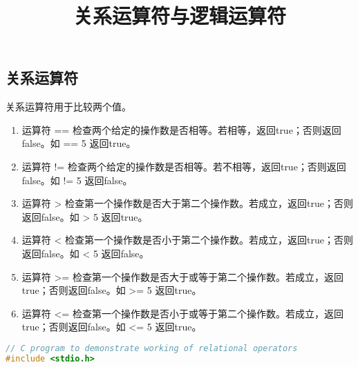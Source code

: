 \documentclass[10pt,a4paper%
tablecaptionabove]{article}
\def\tf{\ttfamily}
\begin{document}
\begin{CJK}{UTF8}{gkai}
 

\newtheorem{li}{例}
\newtheorem{jielun}{结论}
\newtheorem{dingli}{定理}
\newtheorem{mingti}{{命题}} 
\newtheorem{yinli}{{引理}} 
\newtheorem{tuilun}{{推论}}
\newtheorem{dingyi}{{定义}} 
\newtheorem{example}{{例}}
\newtheorem*{example*}{{例}}
\newtheorem*{jie}{{解}}
\newtheorem*{zhengming}{{证明}}
\newtheorem{zhu}{{注}}
\newtheorem*{zhu*}{{注}}
\newtheorem{xingzhi}{{性质}}
\newtheorem{wenti}{{问题}}
\newtheorem{rem}{{Remark}}
\newtheorem{lem}{{Lemma}}
\pagestyle{plain}


\title{关系运算符与逻辑运算符}
\maketitle

\section{关系运算符}
关系运算符用于比较两个值。
\begin{enumerate}
\item
  运算符 {\tf ==}  检查两个给定的操作数是否相等。若相等，返回{\tf true}；否则返回{\tf false}。如 {\tf 5 == 5} 返回{\tf true}。
\item
  运算符 {\tf !=}  检查两个给定的操作数是否相等。若不相等，返回{\tf true}；否则返回{\tf false}。如 {\tf 5 != 5} 返回{\tf false}。
\item
  运算符 {\tf >} 检查第一个操作数是否大于第二个操作数。若成立，返回{\tf true}；否则返回{\tf false}。如 {\tf 6 > 5} 返回{\tf true}。
\item
  运算符 {\tf <} 检查第一个操作数是否小于第二个操作数。若成立，返回{\tf true}；否则返回{\tf false}。如 {\tf 6 < 5} 返回{\tf false}。
\item
  运算符 {\tf >=} 检查第一个操作数是否大于或等于第二个操作数。若成立，返回{\tf true}；否则返回{\tf false}。如 {\tf 5 >= 5} 返回{\tf true}。
\item
  运算符 {\tf <=} 检查第一个操作数是否小于或等于第二个操作数。若成立，返回{\tf true}；否则返回{\tf false}。如 {\tf 5 <= 5} 返回{\tf true}。
\end{enumerate}

\begin{lstlisting}[language=c,backgroundcolor=\color{red!10}]
// C program to demonstrate working of relational operators
#include <stdio.h>
 

\end{lstlisting}
\end{CJK}
\end{document}
